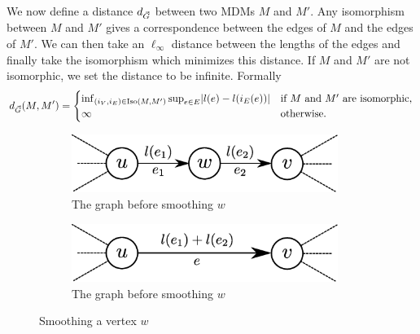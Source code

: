 We now define a distance $d_{\vec{G}}$ between two MDMs $M$ and $M'$.  Any isomorphism between $M$ and $M'$ gives a correspondence between the edges of $M$ and the edges of $M'$. We can then take an $\ell_{\infty}$ distance between the lengths of the edges and finally take the isomorphism which minimizes this distance. If $M$ and $M'$ are not isomorphic, we set the distance to be infinite. Formally
\begin{equation*}
    d_{\vec{G}}(M, M') = \begin{cases}
        \inf_{(i_V, i_E) \in \operatorname{Iso}(M, M')} \sup_{e \in E} \lvert l(e) - l(i_E(e))\rvert & \text{if $M$ and $M'$ are isomorphic,} \\
        \infty & \text{otherwise.}
    \end{cases}
\end{equation*}

\begin{figure}[htbp]
    \centering
    \begin{subfigure}[htbp]{0.45\textwidth}
        \centering
        \includegraphics[width=0.95\textwidth]{Content/Pictures/smoothing1.eps}
        \caption{The graph before smoothing $w$}
    \end{subfigure}
    \hfill
    \begin{subfigure}[htbp]{0.45\textwidth}
        \centering
        \includegraphics[width=0.95\textwidth]{Content/Pictures/smoothing2.eps}
        \caption{The graph before smoothing $w$}
    \end{subfigure}
    \caption{Smoothing a vertex $w$}
    \label{fig:smoothing}
\end{figure}

